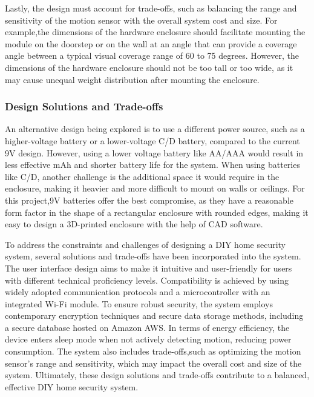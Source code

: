 Lastly, the design must account for trade-offs, such as balancing the range and
sensitivity of the motion sensor with the overall system cost and size.
For example,the dimensions of the hardware enclosure should facilitate mounting the module on the
doorstep or on the wall at an angle that can provide a coverage angle between a
typical visual coverage range of 60 to 75 degrees. %
However, the dimensions of the hardware enclosure should not be too tall or too wide, as it may cause unequal weight
distribution after mounting the enclosure. %

\subsubsection{Design Solutions and Trade-offs}

An alternative design being explored is to use a different power source,
such as a higher-voltage battery or a lower-voltage C/D battery, compared to the
current 9V design. %
However, using a lower voltage battery like AA/AAA would result in less effective mAh and shorter battery life for the system. %
When using batteries like C/D, another challenge is the additional space it would require in the enclosure,
making it heavier and more difficult to mount on walls or ceilings. %
For this project,9V batteries offer the best compromise, as they have a reasonable form factor in the
shape of a rectangular enclosure with rounded edges, making it easy to design a
3D-printed enclosure with the help of CAD software. %

To address the constraints and challenges of designing a DIY home security system,
several solutions and trade-offs have been incorporated into the system. %
The user interface design aims to make it intuitive and user-friendly for users with different
technical proficiency levels. %
Compatibility is achieved by using widely adopted communication protocols and a microcontroller with an integrated Wi-Fi module. %
To ensure robust security, the system employs contemporary encryption techniques
and secure data storage methods, including a secure database hosted on Amazon AWS\@. %
In terms of energy efficiency, the device enters sleep mode when not actively
detecting motion, reducing power consumption. %
The system also includes trade-offs,such as optimizing the motion sensor's range and sensitivity, which may impact the
overall cost and size of the system. %
Ultimately, these design solutions and trade-offs contribute to a balanced, effective DIY home security system. %
